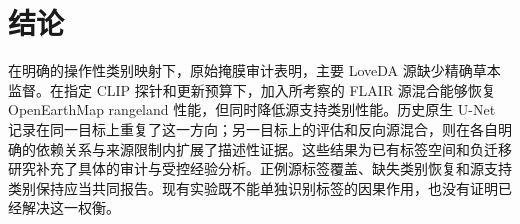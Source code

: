 \section{结论}
\label{sec:conclusion}
在明确的操作性类别映射下，原始掩膜审计表明，主要 LoveDA 源缺少精确草本监督。在指定 CLIP 探针和更新预算下，加入所考察的 FLAIR 源混合能够恢复 OpenEarthMap rangeland 性能，但同时降低源支持类别性能。历史原生 U-Net 记录在同一目标上重复了这一方向；另一目标上的评估和反向源混合，则在各自明确的依赖关系与来源限制内扩展了描述性证据。这些结果为已有标签空间和负迁移研究补充了具体的审计与受控经验分析。正例源标签覆盖、缺失类别恢复和源支持类别保持应当共同报告。现有实验既不能单独识别标签的因果作用，也没有证明已经解决这一权衡。
